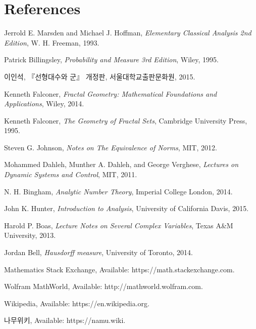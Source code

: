 \section*{References}
\normalsize\ttfamily
\begin{enumerate}[label = {[\arabic*]}]
    \item Jerrold E. Marsden and Michael J. Hoffman, \textit{Elementary Classical Analysis 2nd Edition}, W. H. Freeman, 1993.
    \item Patrick Billingsley, \textit{Probability and Measure 3rd Edition}, Wiley, 1995.
    \item \textrm{이인석}, \textrm{『선형대수와 군』 개정판}, \textrm{서울대학교출판문화원}, 2015.
    \item Kenneth Falconer, \textit{Fractal Geometry: Mathematical Foundations and Applications}, Wiley, 2014.
    \item Kenneth Falconer, \textit{The Geometry of Fractal Sets}, Cambridge University Press, 1995.
    \item Steven G. Johnson, \textit{Notes on The Equivalence of Norms}, MIT, 2012.
    \item Mohammed Dahleh, Munther A. Dahleh, and George Verghese, \textit{Lectures on Dynamic Systems and Control}, MIT, 2011.
    \item N. H. Bingham, \textit{Analytic Number Theory}, Imperial College London, 2014.
    \item John K. Hunter, \textit{Introduction to Analysis}, University of California Davis, 2015.
    \item Harold P. Boas, \textit{Lecture Notes on Several Complex Variables}, Texas A\&M University, 2013.
    \item Jordan Bell, \textit{Hausdorff measure}, University of Toronto, 2014.
    \item Mathematics Stack Exchange, Available: https://math.stackexchange.com.
    \item Wolfram MathWorld, Available: http://mathworld.wolfram.com.
    \item Wikipedia, Available: https://en.wikipedia.org.
    \item \textrm{나무위키}, Available: https://namu.wiki.
\end{enumerate}
\rmfamily